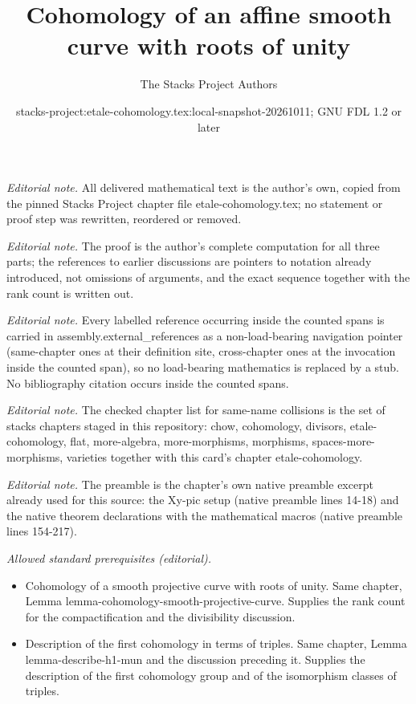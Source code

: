 \documentclass[10pt,a4paper]{amsart}
\title{Cohomology of an affine smooth curve with roots of unity}
\author{The Stacks Project Authors}
\date{stacks-project:etale-cohomology.tex:local-snapshot-20261011; GNU FDL 1.2 or later}
\theoremstyle{plain}
\theoremstyle{definition}
\theoremstyle{remark}
\numberwithin{equation}{subsection}
\begin{document}
\maketitle
\noindent\textit{Editorial note.} All delivered mathematical text is the author's own, copied from the pinned Stacks Project chapter file etale-cohomology.tex; no statement or proof step was rewritten, reordered or removed.\par\medskip
\noindent\textit{Editorial note.} The proof is the author's complete computation for all three parts; the references to earlier discussions are pointers to notation already introduced, not omissions of arguments, and the exact sequence together with the rank count is written out.\par\medskip
\noindent\textit{Editorial note.} Every labelled reference occurring inside the counted spans is carried in assembly.external\_references as a non-load-bearing navigation pointer (same-chapter ones at their definition site, cross-chapter ones at the invocation inside the counted span), so no load-bearing mathematics is replaced by a stub. No bibliography citation occurs inside the counted spans.\par\medskip
\noindent\textit{Editorial note.} The checked chapter list for same-name collisions is the set of stacks chapters staged in this repository: chow, cohomology, divisors, etale-cohomology, flat, more-algebra, more-morphisms, morphisms, spaces-more-morphisms, varieties together with this card's chapter etale-cohomology.\par\medskip
\noindent\textit{Editorial note.} The preamble is the chapter's own native preamble excerpt already used for this source: the Xy-pic setup (native preamble lines 14-18) and the native theorem declarations with the mathematical macros (native preamble lines 154-217).\par\medskip
\noindent\textit{Allowed standard prerequisites (editorial).}\begin{itemize}
\item Cohomology of a smooth projective curve with roots of unity. Same chapter, Lemma lemma-cohomology-smooth-projective-curve. Supplies the rank count for the compactification and the divisibility discussion.
\item Description of the first cohomology in terms of triples. Same chapter, Lemma lemma-describe-h1-mun and the discussion preceding it. Supplies the description of the first cohomology group and of the isomorphism classes of triples.
\end{itemize}\medskip
\end{document}
